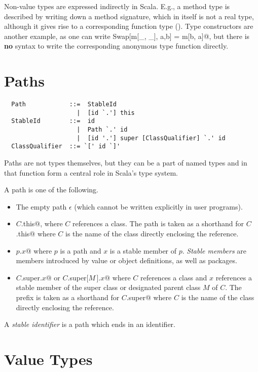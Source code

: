 Non-value types are expressed indirectly in Scala. E.g., a method type is described by writing down a method signature, which in itself is not a real type, although it  gives rise to a corresponding function type (). Type constructors are another example, as one can write \lstinline@type Swap[m[_, _], a,b] = m[b, a]@, but there is \textbf{no} syntax to write the corresponding anonymous type function directly.

\section{Paths}\label{sec:paths}\label{sec:stable-ids}

\syntax\begin{lstlisting}
  Path            ::=  StableId
                    |  [id `.'] this
  StableId        ::=  id
                    |  Path `.' id 
                    |  [id '.'] super [ClassQualifier] `.' id
  ClassQualifier  ::= `[' id `]'
\end{lstlisting}

Paths are not types themselves, but they can be a part of named types
and in that function form a central role in Scala's type system.

A path is one of the following.
\begin{itemize}
\item
The empty path $\epsilon$ (which cannot be written explicitly in user programs).
\item
\lstinline@$C$.this@, where $C$ references a class. 
The path  is taken as a shorthand for \lstinline@$C$.this@ where 
$C$ is the name of the class directly enclosing the reference. 
\item
\lstinline@$p$.$x$@ where $p$ is a path and $x$ is a stable member of $p$.
{\em Stable members} are members introduced by value or object
definitions, as well as packages.
\item
\lstinline@$C$.super.$x$@ or \lstinline@$C$.super[$M\,$].$x$@
where $C$ references a class and $x$ references a 
stable member of the super class or designated parent class $M$ of $C$. 
The prefix  is taken as a shorthand for \lstinline@$C$.super@ where 
$C$ is the name of the class directly enclosing the reference. 
\end{itemize}
A {\em stable identifier} is a path which ends in an identifier.

\section{Value Types}\label{sec:value-types}

